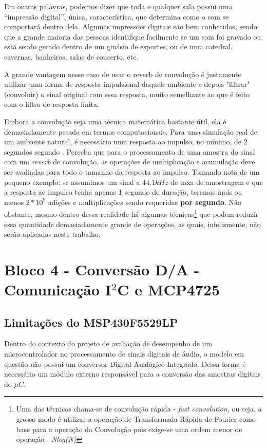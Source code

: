 		Em outras palavras, podemos dizer que toda e qualquer sala possui uma “impressão digital”, única, característica, que determina como o som se comportará dentro dela. Algumas impressões digitais são bem conhecidas, sendo que a grande maioria das pessoas identifique facilmente se um som foi gravado ou está sendo gerado dentro de um ginásio de esportes, ou de uma catedral, cavernas,  banheiros, salas de concerto, etc.
		
		A grande vantagem nesse caso de usar o reverb de convolução é justamente utilizar uma forma de resposta impulsional daquele ambiente e depois "filtrar" (convoluir) o sinal original com essa resposta, muito semelhante ao que é feito com o filtro de resposta finita.
		
		Embora a convolução seja uma técnica matemática bastante útil, ela é demasiadamente pesada em termos computacionais. Para uma simulação real de um ambiente natural, é necessário uma resposta ao impulso, no mínimo, de 2 segundos segundo \cite{Reiss2014}. Perceba que para o processamento de uma amostra do sinal com um \textit{reverb} de convolução, as operações de multiplicação e acumulação deve ser avaliadas para todo o tamanho da resposta ao impulso. Tomando nota de um pequeno exemplo: se assumimos um sinal a $ 44.1kHz $ de taxa de amostragem e que a resposta ao impulso tenha apenas 1 segundo de duração, teremos mais ou menos $2*10^9$ adições e multiplicações sendo requeridas \textbf{por segundo}. Não obstante, mesmo dentro dessa realidade há algumas técnicas\footnote{Uma das técnicas chama-se de convolução rápida - \textit{fast convolution}, ou seja, a grosso modo é utilizar a operação de Transformada Rápida de Fourier como base para a operação da Convolução pois exige-se uma ordem menor de operação - \textit{Nlog(N)}} que podem reduzir essa quantidade demasiadamente grande de operações, as quais, infelizmente, não serão aplicadas neste trabalho.
		
		

\section{Bloco 4 - Conversão D/A - Comunicação I$^2$C e MCP4725}
	
	
	\subsection{Limitações do MSP430F5529LP}
		
		Dentro do contexto do projeto de avaliação de desempenho de um microcontrolador no processamento de sinais digitais de áudio, o modelo em questão não possui um conversor Digital Analógico Integrado. Dessa forma é necessário um módulo externo responsável para a conversão das amostras digitais do $\mu C$.
		
